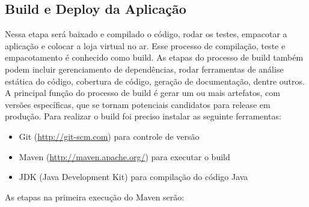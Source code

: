 \subsection{Build e Deploy da Aplicação}

Nessa etapa será baixado e compilado o código, rodar os testes, empacotar a aplicação e colocar a loja virtual no ar. Esse processo de compilação, teste e empacotamento é conhecido como build. As etapas do processo de build também podem incluir gerenciamento de dependências, rodar ferramentas de análise estática do código, cobertura de código, geração de documentação, dentre outros. A principal função do processo de build é gerar um ou mais artefatos, com versões específicas, que se tornam potenciais candidatos para release  em produção.
Para realizar o build foi preciso instalar as seguinte ferramentas:

\begin{itemize}

\item Git (\url{http://git-scm.com}) para controle de versão
\item Maven (\url{http://maven.apache.org/}) para executar o build 
\item JDK (Java Development Kit) para compilação do código Java

\end{itemize}


As etapas na primeira execução do Maven serão:


